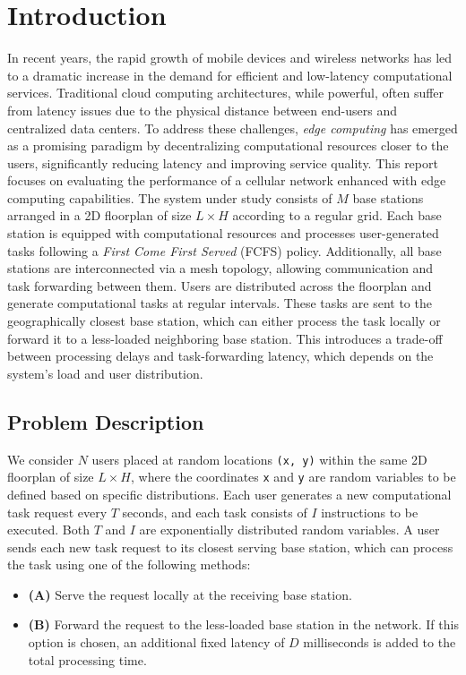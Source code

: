 \documentclass{report}
\begin{document}
\newpage
\tableofcontents
\newpage

\setcounter{page}{1}

\chapter{Introduction}

In recent years, the rapid growth of mobile devices and wireless networks has led to a dramatic increase in the demand for efficient and low-latency computational services.
Traditional cloud computing architectures, while powerful, often suffer from latency issues due to the physical distance between end-users and centralized data centers.
To address these challenges, \textit{edge computing} has emerged as a promising paradigm by decentralizing computational resources closer to the users, significantly reducing latency and improving service quality.
This report focuses on evaluating the performance of a cellular network enhanced with edge computing capabilities. The system under study consists of $M$ base stations arranged in a 2D floorplan of size $L \times H$ according to a regular grid.
Each base station is equipped with computational resources and processes user-generated tasks following a \textit{First Come First Served} (FCFS) policy. Additionally, all base stations are interconnected via a mesh topology, allowing communication and task forwarding between them.
Users are distributed across the floorplan and generate computational tasks at regular intervals.
These tasks are sent to the geographically closest base station, which can either process the task locally or forward it to a less-loaded neighboring base station. This introduces a trade-off between processing delays and task-forwarding latency, which depends on the system's load and user distribution.

\section{Problem Description}

We consider $N$ users placed at random locations \texttt{(x, y)} within the same 2D floorplan of size $L \times H$, where the coordinates \texttt{x} and \texttt{y} are random variables to be defined based on specific distributions.
Each user generates a new computational task request every $T$ seconds, and each task consists of $I$ instructions to be executed. Both $T$ and $I$ are exponentially distributed random variables.
A user sends each new task request to its closest serving base station, which can process the task using one of the following methods:
\begin{itemize}
    \item \textbf{(A)} Serve the request locally at the receiving base station.
    \item \textbf{(B)} Forward the request to the less-loaded base station in the network. If this option is chosen, an additional fixed latency of $D$ milliseconds is added to the total processing time.
\end{itemize}
\end{document}
